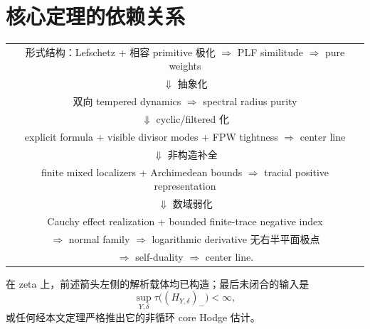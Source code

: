 \documentclass[UTF8,11pt,a4paper]{ctexart}
\theoremstyle{definition}
\theoremstyle{remark}
\newcommand{\1}{\mathbf 1}
\begin{document}
\section{核心定理的依赖关系}

\begin{center}
\begin{tabular}{c}
形式结构：Lefschetz + 相容 primitive 极化 $\Longrightarrow$ PLF similitude $\Longrightarrow$ pure weights\\[4pt]
$\Downarrow$ 抽象化\\[4pt]
双向 tempered dynamics $\Longrightarrow$ spectral radius purity\\[4pt]
$\Downarrow$ cyclic/filtered 化\\[4pt]
explicit formula + visible divisor modes + FPW tightness $\Longrightarrow$ center line\\[4pt]
$\Downarrow$ 非构造补全\\[4pt]
finite mixed localizers + Archimedean bounds $\Longrightarrow$ tracial positive representation\\[4pt]
$\Downarrow$ 数域弱化\\[4pt]
Cauchy effect realization + bounded finite-trace negative index\\
$\Longrightarrow$ normal family $\Longrightarrow$ logarithmic derivative 无右半平面极点\\
$\Longrightarrow$ self-duality $\Longrightarrow$ center line.
\end{tabular}
\end{center}

在 zeta 上，前述箭头左侧的解析载体均已构造；最后未闭合的输入是
\[
 \sup_{Y,\delta}\tau\bigl((H_{Y,\delta})_-\bigr)<\infty,
\]
或任何经本文定理严格推出它的非循环 core Hodge 估计。
\end{document}
